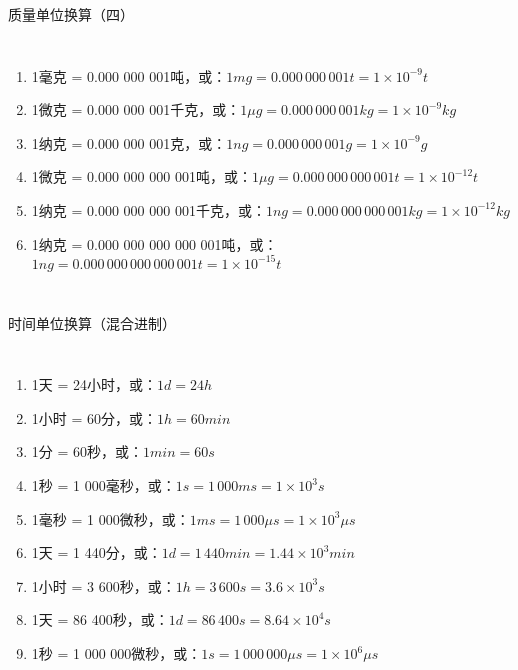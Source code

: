 \documentclass[aspectratio=169]{ctexbeamer} %
\begin{document}
\begin{frame}[t]{质量单位换算（四）}
\begin{columns}
\begin{enumerate}[label={\Alph*.}]
\item 1毫克 = 0.000 000 001吨，或：$1 mg = 0.000 \, 000 \, 001 t = 1 \times 10^{-9} t$ 
\item 1微克 = 0.000 000 001千克，或：$1 \mu g = 0.000 \, 000 \, 001 kg = 1 \times 10^{-9} kg$ 
\item 1纳克 = 0.000 000 001克，或：$1 ng = 0.000 \, 000 \, 001 g = 1 \times 10^{-9} g$ 
\item 1微克 = 0.000 000 000 001吨，或：$1 \mu g = 0.000 \, 000 \, 000 \, 001 t = 1 \times 10^{-12} t$ 
\item 1纳克 = 0.000 000 000 001千克，或：$1 ng = 0.000 \, 000 \, 000 \, 001 kg = 1 \times 10^{-12} kg$ 
\item 1纳克 = 0.000 000 000 000 001吨，或：$1 ng = 0.000 \, 000 \, 000 \, 000 \, 001 t = 1 \times 10^{-15} t$ 

\end{enumerate}
\end{columns}
\end{frame}

\begin{frame}[t]{时间单位换算（混合进制）}
\begin{columns}
\begin{enumerate}[label={\Alph*.}]
\item 1天 = 24小时，或：$1 d = 24 h$ 
\item 1小时 = 60分，或：$1 h = 60 min$ 
\item 1分 = 60秒，或：$1 min = 60 s$ 
\item 1秒 = 1 000毫秒，或：$1 s = 1 \, 000 ms = 1 \times 10^{3} s$ 
\item 1毫秒 = 1 000微秒，或：$1 ms = 1 \, 000 \mu s = 1 \times 10^{3} \mu s$ 
\item 1天 = 1 440分，或：$1 d = 1 \, 440 min = 1.44 \times 10^{3} min$ 
\item 1小时 = 3 600秒，或：$1 h = 3 \, 600 s = 3.6 \times 10^{3} s$ 
\item 1天 = 86 400秒，或：$1 d = 86 \, 400 s = 8.64 \times 10^{4} s$ 
\item 1秒 = 1 000 000微秒，或：$1 s = 1 \, 000 \, 000 \mu s = 1 \times 10^{6} \mu s$ 


\end{enumerate}
\end{columns}
\end{frame}
\end{document}
